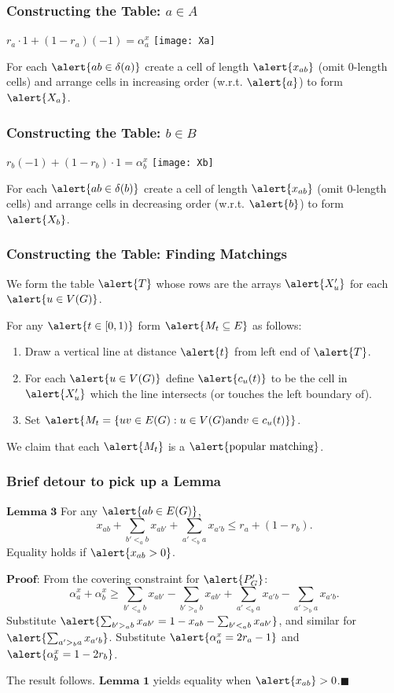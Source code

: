 \documentclass[10pt]{beamer}
\begin{document}
\begin{frame}
\frametitle{Constructing the Table: $a \in A$}
\centering
$r_a\cdot 1 + (1-r_a)(-1) = \alpha^x_a$ 
\texttt{[image: Xa]}

For each $\alert{ab \in \delta(a)}$ create a cell of length $\alert{x_{ab}}$ (omit $0$-length cells) and arrange cells in increasing order (w.r.t. $\alert{a}$) to form $\alert{X_a}$.
\end{frame}

\begin{frame}
\frametitle{Constructing the Table: $b \in B$}
\centering
$r_b(-1) + (1-r_b)\cdot 1 = \alpha^x_b$
\texttt{[image: Xb]}

For each $\alert{ab \in \delta(b)}$ create a cell of length $\alert{x_{ab}}$ (omit $0$-length cells) and arrange cells in decreasing order (w.r.t. $\alert{b}$) to form $\alert{X_b}$.
\end{frame}

\begin{frame}
\frametitle{Constructing the Table: Finding Matchings}
We form the table $\alert{T}$ whose rows are the arrays $\alert{X'_u}$ for each $\alert{u \in V(G)}$.

For any $\alert{t \in [0,1)}$ form $\alert{M_t\subseteq E}$ as follows:
\begin{enumerate}
\item Draw a vertical line at distance $\alert{t}$ from left end of $\alert{T}$.
\item For each $\alert{u \in V(G)}$ define $\alert{c_u(t)}$ to be the cell in $\alert{X'_u}$ which the line intersects (or touches the left boundary of).
\item Set $\alert{M_t = \{ uv \in E(G) : u \in V(G) \text{and} v \in c_u(t)\}}$.
\end{enumerate}

We claim that each $\alert{M_t}$ is a $\text{\alert{popular matching}}$.
\end{frame}

\begin{frame}
\frametitle{Brief detour to pick up a Lemma}
$\textbf{Lemma 3}$ For any $\alert{ab \in E(G)}$,
$$ x_{ab} + \sum_{b' <_a b} x_{ab'} + \sum_{a' <_b a} x_{a'b} \leq r_a + (1-r_b).$$
Equality holds if $\alert{x_{ab} > 0}$.

$\textbf{Proof:}$
From the covering constraint for $\alert{P'_G}$:
$$\alpha^x_a + \alpha^x_b \geq \sum_{b' <_a b} x_{ab'} - \sum_{b' >_a b} x_{ab'} + \sum_{a' <_b a} x_{a'b} - \sum_{a' >_b a} x_{a'b}.$$
Substitute $\alert{\sum_{b' >_a b} x_{ab'} = 1- x_{ab} - \sum_{b'<_a b} x_{ab'}}$, and similar for $\alert{\sum_{a' >_b a}x_{a'b}}$. Substitute $\alert{\alpha^x_a = 2r_a -1}$ and $\alert{\alpha^x_b = 1-2r_b}$.

The result follows. $\textbf{Lemma 1}$ yields equality when $\alert{x_{ab}} > 0$.$\blacksquare$
\end{frame}
\end{document}
